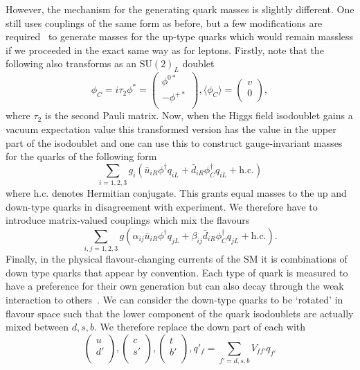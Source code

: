 However, the mechanism for the generating quark masses is slightly different. One still uses couplings of the same form as before, but a few modifications are required~\cite{PDG} to generate masses for the up-type quarks which would remain massless if we proceeded in the exact same way as for leptons. Firstly, note that the following also transforms as an $\mathrm{SU}(2)_{L}$ doublet 
\begin{equation}
    \phi_{C} = i\tau_{2}\phi^{*} = 
    \begin{pmatrix}
        \phi^{0*} \\
        -\phi^{+*}\\
    \end{pmatrix},
    \langle{\phi_{C}}\rangle = 
    \begin{pmatrix} 
        v \\ 
        0 \\ 
    \end{pmatrix},
\end{equation}
where $\tau_{2}$ is the second Pauli matrix. Now, when the Higgs field isodoublet gains a vacuum expectation value this transformed version has the value in the upper part of the isodoublet and one can use this to construct gauge-invariant masses for the quarks of the following form
\begin{equation}
    \sum_{i=1,2,3}g_{i}(
    \bar{u}_{iR}\phi^{\dag}q_{iL} 
    + \bar{d}_{iR}\phi^{\dag}_{C}q_{iL}
    + \mathrm{h.c.})
\end{equation}
where h.c. denotes Hermitian conjugate. This grants equal masses to the up and down-type quarks in disagreement with experiment. We therefore have to introduce matrix-valued couplings which mix the flavours
\begin{equation}
    \sum_{i,j=1,2,3}g(
      \alpha_{ij}\bar{u}_{iR}\phi^{\dag}q_{jL} 
      + \beta_{ij}\bar{d}_{iR}\phi^{\dag}_{C}q_{jL}
      + \mathrm{h.c.}).
\end{equation}
Finally, in the physical flavour-changing currents of the SM it is combinations of down type quarks that appear by convention. Each type of quark is measured to have a preference for their own generation but can also decay through the weak interaction to others~\cite{PDG}. We can consider the down-type quarks to be `rotated' in flavour space such that the lower component of the quark isodoublets are actually mixed between $d,s,b$. We therefore replace the down part of each with 
\begin{equation}
    \begin{pmatrix}
        u \\
        d{'} \\
    \end{pmatrix},
    \begin{pmatrix}
        c \\
        s{'} \\
    \end{pmatrix},
    \begin{pmatrix}
        t \\
        b{'} \\
    \end{pmatrix},
    q{'}_{f} = \sum_{f'=d,s,b}V_{ff'}q_{f'}
\end{equation}
